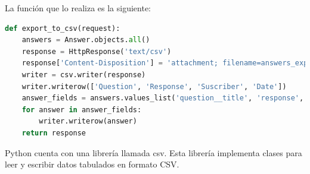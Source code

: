 La función que lo realiza es la siguiente:

\begin{lstlisting}[language=Python]
def export_to_csv(request):
    answers = Answer.objects.all()
    response = HttpResponse('text/csv')
    response['Content-Disposition'] = 'attachment; filename=answers_export.csv'
    writer = csv.writer(response)
    writer.writerow(['Question', 'Response', 'Suscriber', 'Date'])
    answer_fields = answers.values_list('question__title', 'response', 'suscriber__username', 'date')
    for answer in answer_fields:
        writer.writerow(answer)
    return response
\end{lstlisting}

Python cuenta con una librería llamada csv. Esta librería implementa clases para leer y escribir datos tabulados en formato CSV.